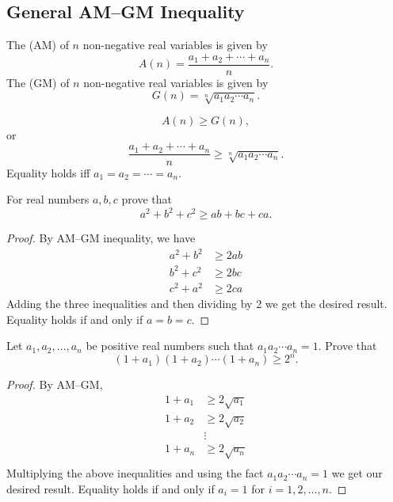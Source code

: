 \subsection{General AM--GM Inequality}
The  (AM) of $n$ non-negative real variables is given by
\[ A(n)=\frac{a_1+a_2+\cdots+a_n}{n}. \]
The  (GM) of $n$ non-negative real variables is given by
\[ G(n)=\sqrt[n]{a_1a_2\cdots a_n}. \]

\begin{theorem}[AM--GM inequality]
\[ A(n)\ge G(n), \]
or
\begin{equation}
\frac{a_1+a_2+\cdots+a_n}{n} \ge \sqrt[n]{a_1a_2\cdots a_n}.
\end{equation} 
Equality holds iff $a_1=a_2=\cdots=a_n$. 
\end{theorem}

\begin{exercise}
For real numbers $a, b, c$ prove that
\[ a^2+b^2+c^2 \ge ab+bc+ca. \]
\end{exercise}

\begin{proof}
By AM--GM inequality, we have
\begin{align*}
a^2+b^2 &\ge 2ab \\
b^2+c^2 &\ge 2bc \\
c^2+a^2 &\ge 2ca
\end{align*}
Adding the three inequalities and then dividing by 2 we get the desired result. Equality holds if and only if $a=b=c$.
\end{proof}

\begin{exercise}
Let $a_1,a_2,\dots,a_n$ be positive real numbers such that $a_1a_2\cdots a_n=1$. Prove that
\[ (1+a_1)(1+a_2)\cdots(1+a_n) \ge 2^n. \]
\end{exercise}

\begin{proof}
By AM--GM,
\begin{align*}
1+a_1 &\ge 2\sqrt{a_1} \\
1+a_2 &\ge 2\sqrt{a_2} \\
&\vdots \\
1+a_n &\ge 2\sqrt{a_n} \\
\end{align*}
Multiplying the above inequalities and using the fact $a_1a_2\cdots a_n=1$ we get our desired result. Equality holds if and only if $a_i=1$ for $i=1,2,\dots,n$.
\end{proof}

